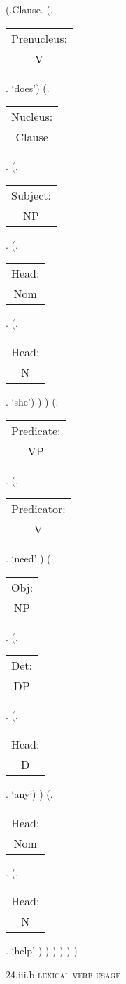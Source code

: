 \documentclass[12pt,letterpaper]{article}
\begin{document}
\begin{figure}
	\begin{center}
		\begin{parsetree}
			(.Clause.
			(.\begin{tabular}{c}Prenucleus:\\V\end{tabular}. `does')
			(.\begin{tabular}{c}Nucleus:\\Clause\end{tabular}.    
			(.\begin{tabular}{c}Subject:\\NP\end{tabular}.  
			(.\begin{tabular}{c}Head:\\Nom\end{tabular}.
			(.\begin{tabular}{c}Head:\\N\end{tabular}. `she')
			)
			)
			(.\begin{tabular}{c}Predicate:\\VP\end{tabular}.
			(.\begin{tabular}{c}Predicator:\\V\end{tabular}.    `need' )
			(.\begin{tabular}{c}Obj:\\NP\end{tabular}.
			(.\begin{tabular}{c}Det:\\DP\end{tabular}.
			(.\begin{tabular}{c}Head:\\D\end{tabular}. `any')
			)
			(.\begin{tabular}{c}Head:\\Nom\end{tabular}.
			(.\begin{tabular}{c}Head:\\N\end{tabular}. `help' )
			)
			)
			)
			)
			)
			
		\end{parsetree}
		\hfill \break \hfill \break
		24.iii.b \textsc{lexical verb usage}
	\end{center}
\end{figure}
\end{document}
